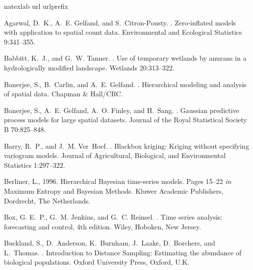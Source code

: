 \documentclass[12pt,english]{article}
\begin{document}
\begin{spacing}{1.9}
\renewcommand{\refname}{Literature Cited}
%


\begin{thebibliography}{59}
\expandafter\ifx\csname natexlab\endcsname\relax\def\natexlab#1{#1}\fi
\expandafter\ifx\csname url\endcsname\relax
  \def\url#1{{\tt #1}}\fi
\expandafter\ifx\csname urlprefix\endcsname\relax\def\urlprefix{URL }\fi

Agarwal, D.~K., A.~E. Gelfand, and S.~Citron-Pousty.
.
\newblock Zero-inflated models with application to spatial count data.
\newblock Environmental and Ecological Statistics { 9}:341--355.

Babbitt, K.~J., and G.~W. Tanner.
.
\newblock Use of temporary wetlands by anurans in a hydrologically modified
  landscape.
\newblock Wetlands { 20}:313--322.

Banerjee, S., B.~Carlin, and A.~E. Gelfand.
.
\newblock Hierarchical modeling and analysis of spatial data.
\newblock Chapman \& Hall/CRC.

Banerjee, S., A.~E. Gelfand, A.~O. Finley, and H.~Sang.
.
\newblock Gaussian predictive process models for large spatial datasets.
\newblock Journal of the Royal Statistical Society B { 70}:825--848.

Barry, R.~P., and J.~M. Ver~Hoef.
.
\newblock Blackbox kriging: Kriging without specifying variogram models.
\newblock Journal of Agricultural, Biological, and Environmental Statistics
  { 1}:297--322.

Berliner, L., 1996.
\newblock Hierarchical {B}ayesian time-series models.
\newblock Pages 15--22 {\em in\/} Maximum Entropy and Bayesian Methods. Kluwer
  Academic Publishers, Dordrecht, The Netherlands.

Box, G. E.~P., G.~M. Jenkins, and G.~C. Reinsel.
.
\newblock Time series analysis: forecasting and control, 4th edition.
\newblock Wiley, Hoboken, New Jersey.

Buckland, S., D.~Anderson, K.~Burnham, J.~Laake, D.~Borchers, and L.~Thomas.
.
\newblock Introduction to Distance Sampling: Estimating the abundance of
  biological populations.
\newblock Oxford University Press, Oxford, U.K.


\end{thebibliography}
\end{spacing}
\end{document}
